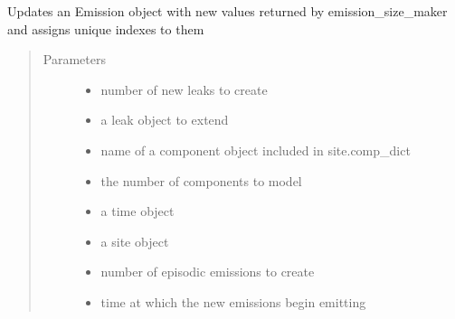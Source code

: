 \documentclass[letterpaper,10pt,english]{sphinxmanual}
\begin{document}
\begin{fulllineitems}
\begin{fulllineitems}
\end{fulllineitems}


\begin{fulllineitems}
\label{\detokenize{index:feast.EmissionSimModules.infrastructure_classes.GasField.emission_maker}}
Updates an Emission object with new values returned by emission\_size\_maker and assigns unique indexes to them
\begin{quote}\begin{description}
\item[{Parameters}] \leavevmode\begin{itemize}
\item {} 
 \textendash{} number of new leaks to create

\item {} 
 \textendash{} a leak object to extend

\item {} 
 \textendash{} name of a component object included in site.comp\_dict

\item {} 
 \textendash{} the number of components to model

\item {} 
 \textendash{} a time object

\item {} 
 \textendash{} a site object

\item {} 
 \textendash{} number of episodic emissions to create

\item {} 
 \textendash{} time at which the new emissions begin emitting

\end{itemize}


\end{description}
\end{quote}
\end{fulllineitems}
\end{fulllineitems}
\end{document}
